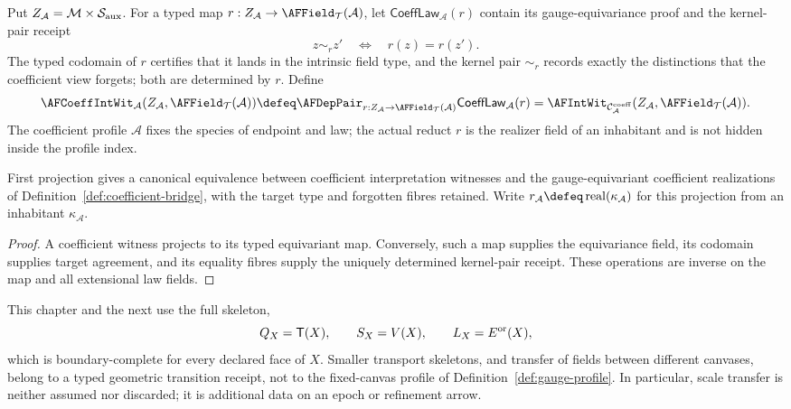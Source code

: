 \begin{definition}
\label{def:coefficient-intwit}
Put $Z_{\mathcal A}=\mathcal M\times\mathcal S_{\rm aux}$.  For a typed map
$r:Z_{\mathcal A}\to\AFField_{\mathcal T}(\mathcal A)$, let
$\mathsf{CoeffLaw}_{\mathcal A}(r)$ contain its gauge-equivariance proof and
the kernel-pair receipt
\[
 z\sim_r z'\quad\Longleftrightarrow\quad r(z)=r(z').
\]
The typed codomain of $r$ certifies that it lands in the intrinsic field
type, and the kernel pair $\sim_r$ records exactly the distinctions that the
coefficient view forgets; both are determined by $r$.  Define
\[
 \AFCoeffIntWit_{\mathcal A}
   (Z_{\mathcal A},\AFField_{\mathcal T}(\mathcal A))
 \defeq
 \AFDepPair_{r:Z_{\mathcal A}\to\AFField_{\mathcal T}(\mathcal A)}
 \mathsf{CoeffLaw}_{\mathcal A}(r)
 =\AFIntWit_{\mathcal C^{\mathrm{coeff}}_{\mathcal A}}
   (Z_{\mathcal A},\AFField_{\mathcal T}(\mathcal A)).
\]
The coefficient profile $\mathcal A$ fixes the species of endpoint and law;
the actual reduct $r$ is the realizer field of an inhabitant and is not hidden
inside the profile index.
\end{definition}

\begin{proposition}
\label{prop:coefficient-intwit-bridge}
First projection gives a canonical equivalence between coefficient
interpretation witnesses and the gauge-equivariant coefficient realizations
of Definition~\ref{def:coefficient-bridge}, with the target type and
forgotten fibres retained.  Write
$r_{\mathcal A}\defeq\operatorname{real}(\kappa_{\mathcal A})$ for this
projection from an inhabitant $\kappa_{\mathcal A}$.
\end{proposition}

\begin{proof}
A coefficient witness projects to its typed equivariant map.  Conversely,
such a map supplies the equivariance field, its codomain supplies target
agreement, and its equality fibres supply the uniquely determined kernel-pair
receipt.  These operations are inverse on the map and all extensional law
fields.
\end{proof}

This chapter and the next use the full skeleton,
\[
 Q_X=\mathsf T(X),\qquad S_X=V(X),\qquad L_X=E^{\rm or}(X),
\]
which is boundary-complete for every declared face of $X$.  Smaller transport
skeletons, and transfer of fields between different canvases, belong to a
typed geometric transition receipt, not to the fixed-canvas profile of
Definition~\ref{def:gauge-profile}.  In particular, scale transfer is neither
assumed nor discarded; it is additional data on an epoch or refinement arrow.

